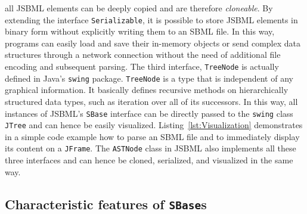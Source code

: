 %
all JSBML elements can be deeply copied and are therefore \emph{cloneable}. By
extending the interface \texttt{Serializable},
%
it is possible to store JSBML
%
elements in binary form without explicitly writing them to an SBML file.
%
In this way, programs can easily load and save their in-memory objects or send
complex data structures through a network connection without the need of
additional file encoding and subsequent parsing. The third interface,
\texttt{TreeNode} is actually defined in Java's \texttt{swing}
%
package.
\texttt{TreeNode} is a type that is independent of any graphical information. It
basically defines recursive methods on hierarchically structured data types,
such as iteration over all of its successors. In this way, all instances of
JSBML's
%
\texttt{SBase} interface can be directly passed to the \texttt{swing}
%
class \texttt{JTree}
%
and can hence be easily visualized. Listing~\vref{lst:Visualization}
demonstrates in a simple code example how to parse an SBML file
%
and to immediately display its content on a \texttt{JFrame}.
%
%
The \texttt{ASTNode} class in JSBML also
implements all these three interfaces and can hence be cloned, serialized, and
visualized in the same way.


\subsection{Characteristic features of \texttt{SBase}s}

